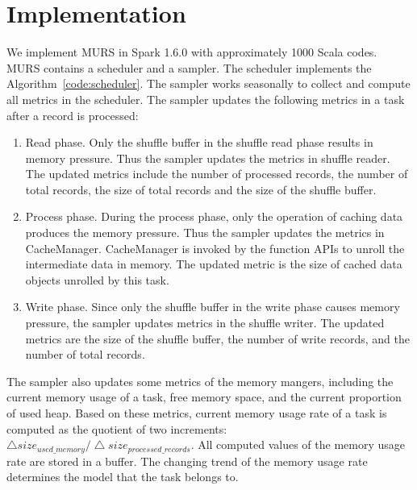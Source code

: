 \section{Implementation}

We implement MURS in Spark 1.6.0 with approximately 1000 Scala codes. MURS contains a scheduler and a sampler. The scheduler implements the Algorithm~\ref{code:scheduler}. 
The sampler works seasonally to collect and compute all metrics in the scheduler. 
The sampler updates the following metrics in a task after a record is processed:

\begin{enumerate}

\item Read phase. Only the shuffle buffer in the shuffle read phase results in memory pressure. Thus the sampler updates the metrics in shuffle reader. The updated metrics include the number of processed records, the number of total records, the size of total records and the size of the shuffle buffer.

\item Process phase. During the process phase, only the operation of caching data produces the memory pressure. Thus the sampler updates the metrics in {\ttfamily \small CacheManager}. {\ttfamily \small CacheManager} is invoked by the function APIs to unroll the intermediate data in memory. The updated metric is the size of cached data objects unrolled by this task.

\item Write phase. Since only the shuffle buffer in the write phase causes memory pressure, the sampler updates metrics in the shuffle writer. The updated metrics are the size of the shuffle buffer, the number of write records, and the number of total records. 

\end{enumerate}

The sampler also updates some metrics of the memory mangers, including the current memory usage of a task, free memory space, and the current proportion of used heap. Based on these metrics, current memory usage rate of a task is computed as the quotient of two increments: $\bigtriangleup size_{used\_memory} / \bigtriangleup size_{processed\_records}$. All computed values of the memory usage rate are stored in a buffer. The changing trend of the memory usage rate determines the model that the task belongs to.

